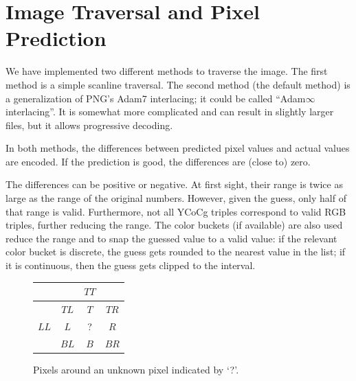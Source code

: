 \documentclass{article}
\begin{document}




\section{Image Traversal and Pixel Prediction}
\label{sec:traversal}

We have implemented two different methods to traverse the image.
The first method is a simple scanline traversal. %
The second method (the default method) is a generalization of PNG's Adam7 interlacing; it could be called ``Adam$\infty$ interlacing''.
It is somewhat more complicated and can result in slightly larger files, but it allows progressive decoding.

In both methods, the differences between predicted pixel values and actual values are encoded.
If the prediction is good, the differences are (close to) zero.

The differences can be positive or negative. At first sight, their range
is twice as large as the range of the original numbers. However, given the guess, only
half of that range is valid. Furthermore, not all YCoCg triples correspond
to valid RGB triples, further reducing the range.
The color buckets (if available)
are also used reduce the range and to snap the guessed value to a valid value:
if the relevant color bucket is discrete, the guess gets rounded to the nearest value in the list;
if it is continuous, then the guess gets clipped to the interval.

\begin{figure}
\begin{center}
\begin{tabular}{|c|c|c|c|}
\hline
     &      & $TT$ & \\
\hline
     & $TL$ &  $T$ & $TR$ \\
\hline
$LL$ &  $L$ &   ?  &  $R$\\
\hline
     & $BL$ &  $B$ & $BR$ \\
\hline
\end{tabular}
\end{center}
\caption{Pixels around an unknown pixel indicated by `?'.}
\label{pixels}
\end{figure}
\end{document}
